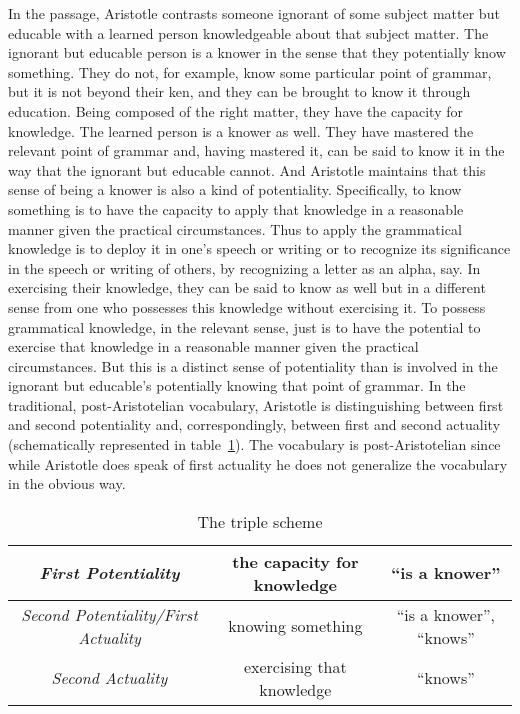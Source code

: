 In the passage, Aristotle contrasts someone ignorant of some subject matter but educable with a learned person knowledgeable about that subject matter. The ignorant but educable person is a knower in the sense that they potentially know something. They do not, for example, know some particular point of grammar, but it is not beyond their ken, and they can be brought to know it through education. Being composed of the right matter, they have the capacity for knowledge. The learned person is a knower as well. They have mastered the relevant point of grammar and, having mastered it, can be said to know it in the way that the ignorant but educable cannot. And Aristotle maintains that this sense of being a knower is also a kind of potentiality. Specifically, to know something is to have the capacity to apply that knowledge in a reasonable manner given the practical circumstances. Thus to apply the grammatical knowledge is to deploy it in one's speech or writing or to recognize its significance in the speech or writing of others, by recognizing a letter as an alpha, say. In exercising their knowledge, they can be said to know as well but in a different sense from one who possesses this knowledge without exercising it. To possess grammatical knowledge, in the relevant sense, just is to have the potential to exercise that knowledge in a reasonable manner given the practical circumstances. But this is a distinct sense of potentiality than is involved in the ignorant but educable's potentially knowing that point of grammar.  In the traditional, post-Aristotelian vocabulary, Aristotle is distinguishing between first and second potentiality and, correspondingly, between first and second actuality (schematically represented in table~\ref{tab:triple}). The vocabulary is post-Aristotelian since while Aristotle does speak of first actuality he does not generalize the vocabulary in the obvious way.

\begin{table}[htbp]
	\centering
		\begin{tabular}{ccc}
			\hline
			\emph{First Potentiality} & the capacity for knowledge & ``is a knower''\\
			\hline
			\emph{Second Potentiality/First Actuality} & knowing something & ``is a knower'', ``knows''\\
			\hline
			\emph{Second Actuality} & exercising that knowledge & ``knows''\\
			\hline
		\end{tabular}
	\caption{The triple scheme}
	\label{tab:triple}
\end{table}


